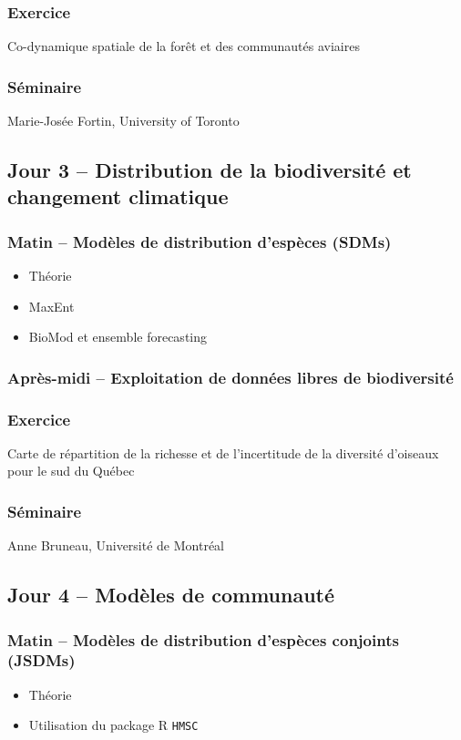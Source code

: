 \documentclass[12]{article}
\begin{document}
  \subsubsection*{Exercice}
  Co-dynamique spatiale de la forêt et des communautés aviaires

  \subsubsection*{Séminaire}
  Marie-Josée Fortin, University of Toronto

  \subsection*{Jour 3 -- Distribution de la biodiversité et changement climatique}
  \subsubsection*{Matin -- Modèles de distribution d'espèces (SDMs)}
  \begin{itemize}
    \item Théorie
    \item MaxEnt
    \item BioMod et ensemble forecasting
  \end{itemize}
  \subsubsection*{Après-midi -- Exploitation de données libres de biodiversité}
  \subsubsection*{Exercice}
  Carte de répartition de la richesse et de l'incertitude de la diversité d'oiseaux pour le sud du Québec

  \subsubsection*{Séminaire}
  Anne Bruneau, Université de Montréal

  \subsection*{Jour 4 -- Modèles de communauté}
  \subsubsection*{Matin -- Modèles de distribution d'espèces conjoints (JSDMs)}
  \begin{itemize}
    \item Théorie
    \item Utilisation du package R \texttt{HMSC}
  \end{itemize}
\end{document}
